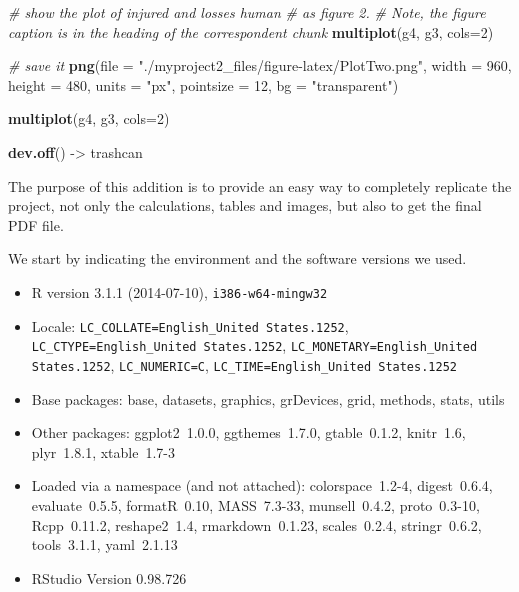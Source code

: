 \documentclass[12pt,spanish, american,b4paper, onecolumn, lmargin=1cm, rmargin=1cm, tmargin=1cm, bmargin=2cm,]{article}
\newenvironment{Shaded}{}{}
\newcommand{\KeywordTok}[1]{\textbf{{#1}}}
\newcommand{\DataTypeTok}[1]{\textcolor[rgb]{0.50,0.00,0.00}{{#1}}}
\newcommand{\DecValTok}[1]{\textcolor[rgb]{0.00,0.00,1.00}{{#1}}}
\newcommand{\StringTok}[1]{\textcolor[rgb]{0.87,0.00,0.00}{{#1}}}
\newcommand{\CommentTok}[1]{\textcolor[rgb]{0.50,0.50,0.50}{\textit{{#1}}}}
\newcommand{\NormalTok}[1]{{#1}}
\begin{document}
\begin{Shaded}
\begin{Highlighting}[]
\CommentTok{# show the plot of injured and losses human }
\CommentTok{# as figure 2.}
\CommentTok{# Note, the figure caption is in the heading of the correspondent chunk }
\KeywordTok{multiplot}\NormalTok{(g4, g3, }\DataTypeTok{cols=}\DecValTok{2}\NormalTok{)}

\CommentTok{# save it}
\KeywordTok{png}\NormalTok{(}\DataTypeTok{file =} \StringTok{"./myproject2_files/figure-latex/PlotTwo.png"}\NormalTok{, }
    \DataTypeTok{width =} \DecValTok{960}\NormalTok{, }
    \DataTypeTok{height =} \DecValTok{480}\NormalTok{, }
    \DataTypeTok{units =} \StringTok{"px"}\NormalTok{, }
    \DataTypeTok{pointsize =} \DecValTok{12}\NormalTok{,}
    \DataTypeTok{bg =} \StringTok{"transparent"}\NormalTok{)}

\KeywordTok{multiplot}\NormalTok{(g4, g3, }\DataTypeTok{cols=}\DecValTok{2}\NormalTok{)}

\KeywordTok{dev.off}\NormalTok{() ->}\StringTok{ }\NormalTok{trashcan}
\end{Highlighting}
\end{Shaded}

\newpage


The purpose of this addition is to provide an easy way to completely
replicate the project, not only the calculations, tables and images, but
also to get the final PDF file.

We start by indicating the environment and the software versions we
used.

\begin{itemize}\raggedright
  \item R version 3.1.1 (2014-07-10), \verb|i386-w64-mingw32|
  \item Locale: \verb|LC_COLLATE=English_United States.1252|, \verb|LC_CTYPE=English_United States.1252|, \verb|LC_MONETARY=English_United States.1252|, \verb|LC_NUMERIC=C|, \verb|LC_TIME=English_United States.1252|
  \item Base packages: base, datasets, graphics, grDevices, grid,
    methods, stats, utils
  \item Other packages: ggplot2~1.0.0, ggthemes~1.7.0, gtable~0.1.2,
    knitr~1.6, plyr~1.8.1, xtable~1.7-3
  \item Loaded via a namespace (and not attached): colorspace~1.2-4,
    digest~0.6.4, evaluate~0.5.5, formatR~0.10, MASS~7.3-33,
    munsell~0.4.2, proto~0.3-10, Rcpp~0.11.2, reshape2~1.4,
    rmarkdown~0.1.23, scales~0.2.4, stringr~0.6.2, tools~3.1.1,
    yaml~2.1.13
  \item RStudio Version 0.98.726
\end{itemize}
\end{document}
